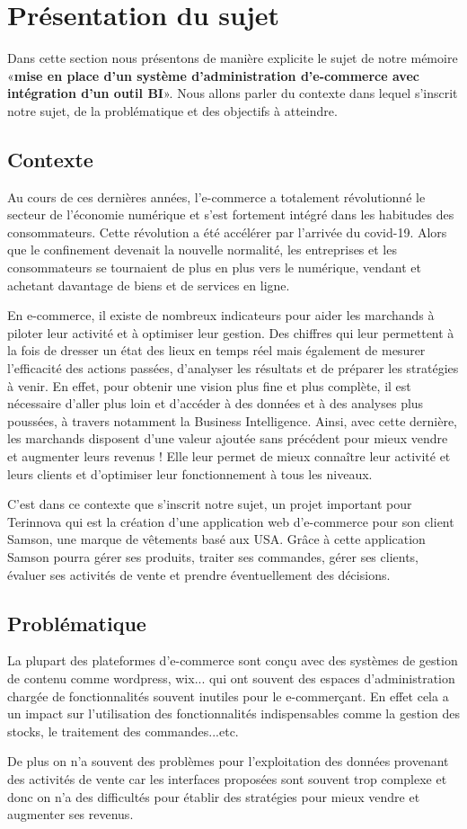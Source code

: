 \documentclass[a4paper, 12pt]{report}
\begin{document}
\section{Présentation du sujet}
{Dans cette section nous présentons de manière explicite le sujet de notre mémoire «\textbf{mise en place d’un système d’administration d’e-commerce avec intégration d’un outil BI}». Nous allons parler du contexte dans lequel s’inscrit notre sujet, de la problématique et des objectifs à atteindre.}
\subsection{Contexte}
{Au cours de ces dernières années, l'e-commerce a totalement révolutionné le secteur de l’économie numérique et s’est fortement intégré dans les habitudes des consommateurs. Cette révolution a été accélérer par l’arrivée du covid-19. Alors que le confinement devenait la nouvelle normalité, les entreprises et les consommateurs se tournaient de plus en plus vers le numérique, vendant et achetant davantage de biens et de services en ligne. 

En e-commerce, il existe de nombreux indicateurs pour aider les marchands à piloter leur activité et à optimiser leur gestion. Des chiffres qui leur permettent à la fois de dresser un état des lieux en temps réel mais également de mesurer l’efficacité des actions passées, d’analyser les résultats et de préparer les stratégies à venir. En effet, pour obtenir une vision plus fine et plus complète, il est nécessaire d’aller plus loin et d’accéder à des données et à des analyses plus poussées, à travers notamment la Business Intelligence. Ainsi, avec cette dernière, les marchands disposent d’une valeur ajoutée sans précédent pour mieux vendre et augmenter leurs revenus ! Elle leur permet de mieux connaître leur activité et leurs clients et d’optimiser leur fonctionnement à tous les niveaux.

C’est dans ce contexte que s'inscrit notre sujet, un projet important pour Terinnova qui est la création d'une application web d’e-commerce pour son client Samson, une marque de vêtements basé aux USA. Grâce à cette application Samson pourra gérer ses produits, traiter ses commandes, gérer ses clients, évaluer ses activités de vente et prendre éventuellement des décisions.}
\subsection{Problématique}
{La plupart des plateformes d’e-commerce sont conçu avec des systèmes de gestion de contenu comme wordpress, wix... qui ont souvent des espaces d’administration chargée de fonctionnalités souvent inutiles pour le e-commerçant. En effet cela a un impact sur l’utilisation des fonctionnalités indispensables comme la gestion des stocks, le traitement des commandes...etc.

De plus on n'a souvent des problèmes pour l'exploitation des données provenant des activités de vente car les interfaces proposées sont souvent trop complexe et donc on n'a des difficultés pour établir des stratégies pour mieux vendre et augmenter ses revenus.}
\end{document}
